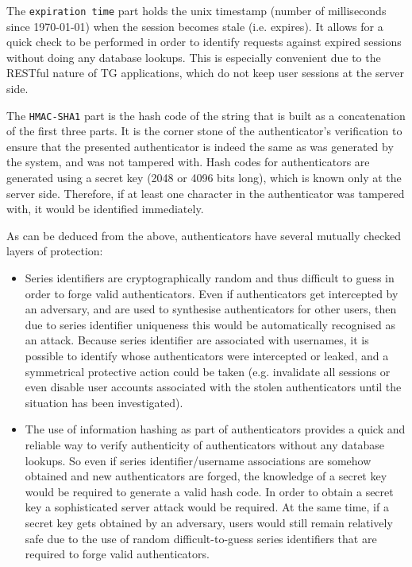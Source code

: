 \documentclass[a4paper,12pt,oneside,openright]{memoir}
\begin{document}
	The \texttt{expiration time} part holds the unix timestamp (number of milliseconds since 1970-01-01) when the session becomes stale (i.e. expires).
	It allows for a quick check to be performed in order to identify requests against expired sessions without doing any database lookups.
	This is especially convenient due to the RESTful nature of TG applications, which do not keep user sessions at the server side.

	The \texttt{HMAC-SHA1} part is the hash code of the string that is built as a concatenation of the first three parts.
	It is the corner stone of the authenticator's verification to ensure that the presented authenticator is indeed the same as was generated by the system, and was not tampered with.
	Hash codes for authenticators are generated using a secret key (2048 or 4096 bits long), which is known only at the server side.
	Therefore, if at least one character in the authenticator was tampered with, it would be identified immediately.

	As can be deduced from the above, authenticators have several mutually checked layers of protection:
	\begin{itemize}
	\item Series identifiers are cryptographically random and thus difficult to guess in order to forge valid authenticators.
	Even if authenticators get intercepted by an adversary, and are used to synthesise authenticators for other users, then due to series identifier uniqueness this would be automatically recognised as an attack.
	Because series identifier are associated with usernames, it is possible to identify whose authenticators were intercepted or leaked, and a symmetrical protective action could be taken (e.g. invalidate all sessions or even disable user accounts associated with the stolen authenticators until the situation has been investigated).

	\item The use of information hashing as part of authenticators provides a quick and reliable way to verify authenticity of authenticators without any database lookups.
	So even if series identifier/username associations are somehow obtained and new authenticators are forged, the knowledge of a secret key would be required to generate a valid hash code.
	In order to obtain a secret key a sophisticated server attack would be required.
	At the same time, if a secret key gets obtained by an adversary, users would still remain relatively safe due to the use of random difficult-to-guess series identifiers that are required to forge valid authenticators.
	\end{itemize}
\end{document}
